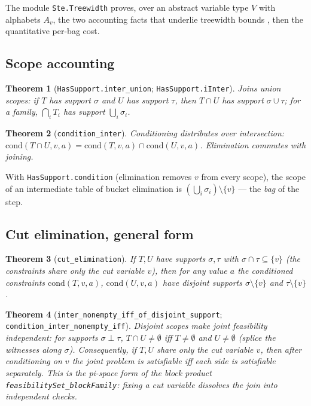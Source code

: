 \documentclass[11pt]{article}
\newtheorem{theorem}{Theorem}
\newcommand{\lean}[1]{\texttt{#1}}
\begin{document}
The module \lean{Ste.Treewidth} proves, over an abstract variable type
$V$ with alphabets $A_v$, the two accounting facts that underlie
treewidth bounds \citep{dechter2003constraint}, then the quantitative
per-bag cost.

\subsection*{Scope accounting}

\begin{theorem}[\lean{HasSupport.inter\_union};
\lean{HasSupport.iInter}]
Joins union scopes: if $T$ has support $\sigma$ and $U$ has support
$\tau$, then $T \cap U$ has support $\sigma \cup \tau$; for a family,
$\bigcap_i T_i$ has support $\bigcup_i \sigma_i$.
\end{theorem}

\begin{theorem}[\lean{condition\_inter}]
Conditioning distributes over intersection:
$\mathrm{cond}(T \cap U, v, a) = \mathrm{cond}(T, v, a) \cap
\mathrm{cond}(U, v, a)$.  Elimination commutes with joining.
\end{theorem}

With \lean{HasSupport.condition} (elimination removes $v$ from every
scope), the scope of an intermediate table of bucket elimination is
$(\bigcup_i \sigma_i) \setminus \{v\}$ --- the \emph{bag} of the step.

\subsection*{Cut elimination, general form}

\begin{theorem}[\lean{cut\_elimination}]
If $T, U$ have supports $\sigma, \tau$ with $\sigma \cap \tau
\subseteq \{v\}$ (the constraints share only the cut variable $v$),
then for any value $a$ the conditioned constraints
$\mathrm{cond}(T, v, a)$, $\mathrm{cond}(U, v, a)$ have
\emph{disjoint} supports $\sigma \setminus \{v\}$ and
$\tau \setminus \{v\}$.
\end{theorem}

\begin{theorem}[\lean{inter\_nonempty\_iff\_of\_disjoint\_support};
\lean{condition\_inter\_nonempty\_iff}]
Disjoint scopes make joint feasibility independent: for supports
$\sigma \perp \tau$, $T \cap U \neq \emptyset$ iff $T \neq \emptyset$
and $U \neq \emptyset$ (splice the witnesses along $\sigma$).
Consequently, if $T, U$ share only the cut variable $v$, then after
conditioning on $v$ the joint problem is satisfiable iff each side is
satisfiable separately.  This is the pi-space form of the block
product \lean{feasibilitySet\_blockFamily}: fixing a cut variable
dissolves the join into independent checks.
\end{theorem}
\end{document}

